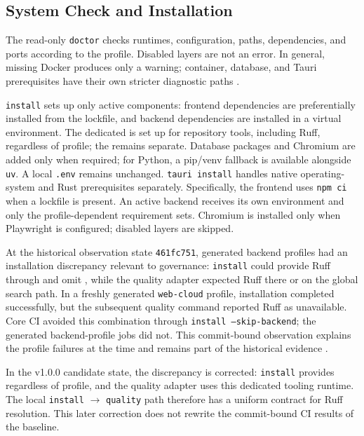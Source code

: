 \subsection{System Check and Installation}
\label{subsec:systempruefung-installation}

The read-only \texttt{doctor} checks runtimes, configuration, paths,
dependencies, and ports according to the profile. Disabled layers are not an
error. In general, missing Docker produces only a warning; container,
database, and Tauri prerequisites have their own stricter diagnostic paths
\parencite{kleiveist2026tooling,kleiveist2026configuration}.

\texttt{install} sets up only active components: frontend dependencies are
preferentially installed from the lockfile, and backend dependencies are
installed in a virtual environment. The dedicated  is set up
for repository tools, including Ruff, regardless of profile; the
 remains separate. Database packages and Chromium are
added only when required; for Python, a pip/venv fallback is available
alongside \texttt{uv}. A local \texttt{.env} remains unchanged. \texttt{tauri
install} handles native operating-system and Rust prerequisites separately.
Specifically, the frontend uses \texttt{npm ci} when a lockfile is present. An
active backend receives its own environment and only the profile-dependent
requirement sets. Chromium is installed only when Playwright is configured;
disabled layers are skipped.

At the historical observation state \texttt{461fc751}, generated backend
profiles had an installation discrepancy relevant to governance: \texttt{install}
could provide Ruff through  and omit
, while the quality adapter expected Ruff there or on the
global search path. In a freshly generated \texttt{web-cloud} profile,
installation completed successfully, but the subsequent quality command
reported Ruff as unavailable. Core CI avoided this combination through
\texttt{install --skip-backend}; the generated backend-profile jobs did not.
This commit-bound observation explains the profile failures at the time and
remains part of the historical evidence
\parencite{kleiveist2026quality-implementation,kleiveist2026quality-ci}.

In the v1.0.0 candidate state, the discrepancy is corrected: \texttt{install}
provides  regardless of profile, and the quality adapter uses
this dedicated tooling runtime. The local \texttt{install} $\rightarrow$
\texttt{quality} path therefore has a uniform contract for Ruff resolution.
This later correction does not rewrite the commit-bound CI results of the
baseline.

